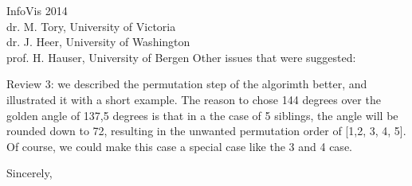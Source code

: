 \documentclass{letter}
\begin{document}
\begin{letter}{InfoVis 2014 \\ dr. M. Tory, University of Victoria \\ dr. J. Heer, University of Washington \\ prof. H. Hauser, University of Bergen}
Other issues that were suggested:

Review 3: we described the permutation step of the algorimth better, and illustrated it with a short example. The reason to chose 144 degrees over the golden angle of 137,5 degrees is that in a the case of 5 siblings, the angle will be rounded down to 72, resulting in the unwanted permutation order of [1,2, 3, 4, 5]. Of course, we could make this case a special case like the 3 and 4 case.







\closing{Sincerely,}
\end{letter}
\end{document}
